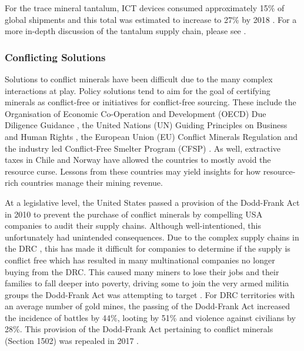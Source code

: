 \documentclass{article}
\begin{document}
For the trace mineral tantalum, ICT devices consumed approximately 15\% of global shipments and this total was estimated to increase to 27\% by 2018 \cite{fitzpatrick2015conflict}. For a more in-depth discussion of the tantalum supply chain, please see \cite{mancheri2018resilience}.

\subsubsection{Conflicting Solutions}
Solutions to conflict minerals have been difficult due to the many complex interactions at play. Policy solutions tend to aim for the goal of certifying minerals as conflict-free or initiatives for conflict-free sourcing. These include the Organisation of Economic Co-Operation and Development (OECD) Due Diligence Guidance \cite{oced2016duediligence}, the United Nations (UN) Guiding Principles on Business and Human Rights \cite{un2011guidingprinciples}, the European Union (EU) Conflict Minerals Regulation \cite{ec2020duediligence} and the industry led Conflict-Free Smelter Program (CFSP) \cite{cfsi2016cfsp}. As well, extractive taxes in Chile \cite{anrc2016chilecasestudy} and Norway \cite{lund2014state} have allowed the countries to mostly avoid the resource curse. Lessons from these countries may yield insights for how resource-rich countries manage their mining revenue.

At a legislative level, the United States passed a provision of the Dodd-Frank Act in 2010 to prevent the purchase of conflict minerals by compelling USA companies to audit their supply chains. Although well-intentioned, this unfortunately had unintended consequences. Due to the complex supply chains in the DRC \cite{moran2015global, reller2009mobile}, this has made it difficult for companies to determine if the supply is conflict free which has resulted in many multinational companies no longer buying from the DRC. This caused many miners to lose their jobs and their families to fall deeper into poverty, driving some to join the very armed militia groups the Dodd-Frank Act was attempting to target \cite{cfr2021congoconflict}. For DRC territories with an average number of gold mines, the passing of the Dodd-Frank Act increased the incidence of battles by 44\%, looting by 51\% and violence against civilians by 28\%. This provision of the Dodd-Frank Act pertaining to conflict minerals (Section 1502) was repealed in 2017 \cite{stoop2018more}. 
\end{document}
